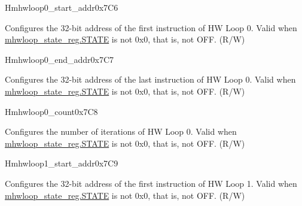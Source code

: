 \begin{register}{H}{mhwloop0\_start\_addr}{0x7C6}\label{regdesc:MHWLOOP0_START_ADDR}
%
\regnewline%
\begin{regdesc}\begin{reglist}
\label{fielddesc:HWLP0_SA}\item [SA] Configures the 32-bit address of the first instruction of HW Loop 0. Valid when \hyperref[fielddesc:HWSTATE]{mhwloop\_state\_reg.STATE} is not 0x0, that is, not OFF. (R/W)
\end{reglist}\end{regdesc}
\end{register}

\begin{register}{H}{mhwloop0\_end\_addr}{0x7C7}\label{regdesc:MHWLOOP0_END_ADDR}
%
\regnewline%
\begin{regdesc}\begin{reglist}
\label{fielddesc:HWLP0_EA}\item [EA] Configures the 32-bit address of the last instruction of HW Loop 0. Valid when \hyperref[fielddesc:HWSTATE]{mhwloop\_state\_reg.STATE} is not 0x0, that is, not OFF. (R/W)
\end{reglist}\end{regdesc}
\end{register}

\begin{register}{H}{mhwloop0\_count}{0x7C8}\label{regdesc:MHWLOOP0_COUNT}
%
%
\regnewline%
\begin{regdesc}\begin{reglist}
\label{fielddesc:HWLP0_CNT}\item [COUNT] Configures the number of iterations of HW Loop 0. Valid when \hyperref[fielddesc:HWSTATE]{mhwloop\_state\_reg.STATE} is not 0x0, that is, not OFF. (R/W)
\end{reglist}\end{regdesc}
\end{register}

\begin{register}{H}{mhwloop1\_start\_addr}{0x7C9}\label{regdesc:MHWLOOP1_START_ADDR}
%
\regnewline%
\begin{regdesc}\begin{reglist}
\label{fielddesc:HWLP1_SA}\item [SA] Configures the 32-bit address of the first instruction of HW Loop 1. Valid when \hyperref[fielddesc:HWSTATE]{mhwloop\_state\_reg.STATE} is not 0x0, that is, not OFF. (R/W)
\end{reglist}\end{regdesc}
\end{register}

